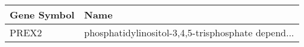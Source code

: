 \begin{tabular}{ll}
\toprule
Gene Symbol &                                               Name \\
\midrule
      PREX2 & phosphatidylinositol-3,4,5-trisphosphate depend... \\
\bottomrule
\end{tabular}
